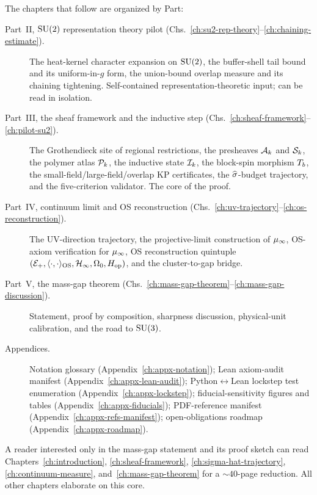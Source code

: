 The chapters that follow are organized by Part:

\begin{description}
  \item[Part~II, $\mathrm{SU}(2)$ representation theory pilot
    (Chs.~\ref{ch:su2-rep-theory}--\ref{ch:chaining-estimate}).]
    The heat-kernel character expansion on $\mathrm{SU}(2)$, the
    buffer-shell tail bound and its uniform-in-$g$ form, the
    union-bound overlap measure and its chaining tightening.
    Self-contained representation-theoretic input; can be read in
    isolation.
  \item[Part~III, the sheaf framework and the inductive step
    (Chs.~\ref{ch:sheaf-framework}--\ref{ch:pilot-su2}).]
    The Grothendieck site of regional restrictions, the
    presheaves $\mathcal{A}_k$ and $\mathcal{S}_k$, the polymer atlas $\mathcal{P}_k$, the
    inductive state $\mathcal{I}_k$, the block-spin morphism $T_b$, the
    small-field/large-field/overlap KP certificates, the
    $\widehat{\sigma}$-budget trajectory, and the five-criterion validator.
    The core of the proof.
  \item[Part~IV, continuum limit and OS reconstruction
    (Chs.~\ref{ch:uv-trajectory}--\ref{ch:os-reconstruction}).]
    The UV-direction trajectory, the projective-limit construction
    of $\mu_\infty$, OS-axiom verification for $\mu_\infty$, OS
    reconstruction quintuple $(\mathcal{E}_+, \langle\cdot,\cdot\rangle_{\mathrm{OS}}, \mathcal{H}_\infty, \Omega_0,
    H_{\mathrm{op}})$, and the cluster-to-gap bridge.
  \item[Part~V, the mass-gap theorem
    (Chs.~\ref{ch:mass-gap-theorem}--\ref{ch:mass-gap-discussion}).]
    Statement, proof by composition, sharpness discussion,
    physical-unit calibration, and the road to $\mathrm{SU}(3)$.
  \item[Appendices.]  Notation glossary
    (Appendix~\ref{ch:appx-notation}); Lean axiom-audit manifest
    (Appendix~\ref{ch:appx-lean-audit}); Python$\leftrightarrow$Lean
    lockstep test enumeration
    (Appendix~\ref{ch:appx-lockstep}); fiducial-sensitivity
    figures and tables (Appendix~\ref{ch:appx-fiducials});
    PDF-reference manifest
    (Appendix~\ref{ch:appx-refs-manifest}); open-obligations
    roadmap (Appendix~\ref{ch:appx-roadmap}).
\end{description}

A reader interested only in the mass-gap statement and its proof
sketch can read Chapters~\ref{ch:introduction},
\ref{ch:sheaf-framework}, \ref{ch:sigma-hat-trajectory},
\ref{ch:continuum-measure}, and~\ref{ch:mass-gap-theorem} for a
$\sim 40$-page reduction.  All other chapters elaborate on this
core.
